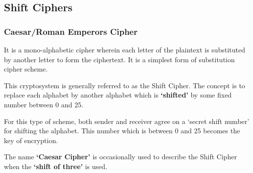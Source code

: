 \documentclass[british]{article}
\begin{document}
\subsection{Shift Ciphers}

\subsubsection{Caesar/Roman Emperors Cipher}

It is a mono-alphabetic cipher wherein each letter of the plaintext
is substituted by another letter to form the ciphertext. It is a simplest
form of substitution cipher scheme.

This cryptosystem is generally referred to as the Shift Cipher. The
concept is to replace each alphabet by another alphabet which is \textbf{\textquoteleft shifted\textquoteright{}}
by some fixed number between 0 and 25.

For this type of scheme, both sender and receiver agree on a \textquoteleft secret
shift number\textquoteright{} for shifting the alphabet. This number
which is between 0 and 25 becomes the key of encryption.

The name \textbf{\textquoteleft Caesar Cipher\textquoteright{}} is
occasionally used to describe the Shift Cipher when the \textbf{\textquoteleft shift
of three\textquoteright{}} is used.
\end{document}
